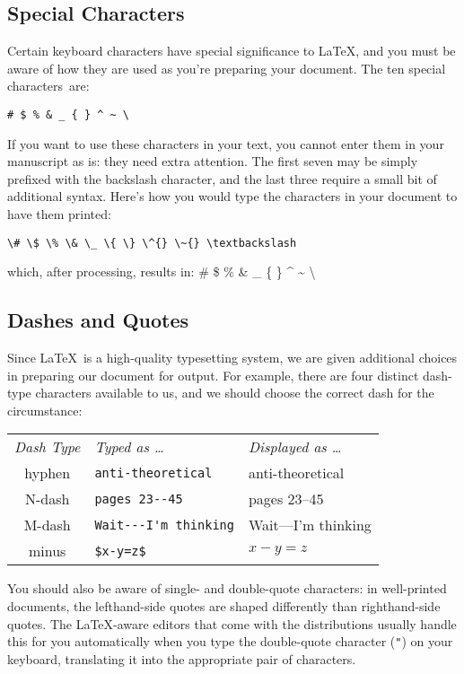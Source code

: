 \documentclass[11pt,letterpaper]{ltxdockit}[2011/03/25]
\renewcommand{\-}{\discretionary{}{}{}}
\begin{document}
\subsection{Special Characters}
\label{sec:special}
Certain keyboard characters have special significance to \LaTeX, and
you must be aware of how they are used as you're preparing your
document.  The ten special characters~are:
\begin{verbatim}
# $ % & _ { } ^ ~ \
\end{verbatim}
If you want to use these characters in your text, you cannot enter them in
your manuscript as is: they need extra attention.  The first seven may
be simply prefixed with the backslash character, and the last three
require a small bit of additional syntax.  Here's how you would type
the characters in your document to have them printed:
\begin{verbatim}
\# \$ \% \& \_ \{ \} \^{} \~{} \textbackslash
\end{verbatim}
which, after processing, results in: \# \$ \% \& \_ \{ \} \^{} \~{} \textbackslash

\subsection{Dashes and Quotes}
Since \LaTeX\ is a high-quality typesetting system, we are given
additional choices in preparing our document for output.  For example,
there are four distinct dash-type
characters available to us, and we
should choose the correct dash for the circumstance:
\begin{center}
\begin{tabular}{c l l}
\textit{Dash Type}&\textit{Typed as \ldots}&\textit{Displayed as \ldots}\\[3pt]
hyphen & \verb|anti-theoretical| & anti-theoretical \\
N-dash & \verb|pages 23--45| & pages 23--45 \\
M-dash & \verb|Wait---I'm thinking| & Wait---I'm thinking \\
minus & \verb|$x-y=z$| & $x-y=z$ \\
\end{tabular}
\end{center}

You should also be aware of single- and double-quote characters: in
well-printed documents, the lefthand-side quotes are shaped differently than righthand-side quotes.  The
\LaTeX-aware editors that come with the distributions usually handle
this for you automatically when you type the double-quote character
(\texttt{"}) on your keyboard, translating it into the appropriate
pair of characters.
\end{document}
